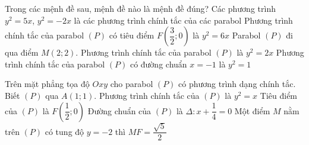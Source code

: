 \begin{ex}%
	Trong các mệnh đề sau, mệnh đề nào là mệnh đề đúng?
	\choiceTF
	{Các phương trình $y^2=5x$, $y^2=-2x$ là các phương trình chính tắc của các parabol}
	{\True Phương trình chính tắc của parabol $(P)$ có tiêu điểm $F\left(\dfrac{3}{2}; 0\right)$ là $y^2=6x$}
	{\True Parabol $(P)$ đi qua điểm $M(2; 2)$. Phương trình chính tắc của parabol $(P)$ là $y^2=2x$}
	{Phương trình chính tắc của parabol $(P)$ có đường chuẩn $x=-1$ là $y^2=1$}
\end{ex}
\begin{ex}%
	Trên mặt phẳng tọa độ $Oxy$ cho parabol $(P)$ có phương trình dạng chính tắc. Biết $(P)$ qua $A(1;1)$.
	\choiceTF
	{\True Phương trình chính tắc của $(P)$ là $y^2=x$}
	{Tiêu điểm của $(P)$ là $F\left(\dfrac{1}{2}; 0\right)$}
	{\True Đường chuẩn của $(P)$ là $\Delta\colon  x+\dfrac{1}{4}=0$}
	{Một điểm $M$ nằm trên $(P)$ có tung độ $y=-2$ thì $MF=\dfrac{\sqrt{5}}{2}$}
\end{ex}
